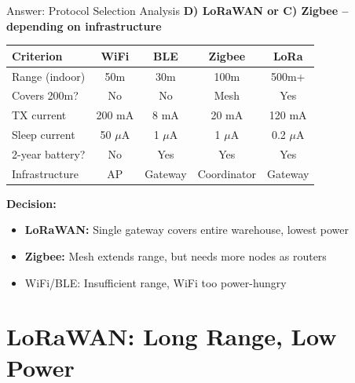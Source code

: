 \documentclass[aspectratio=169,11pt]{beamer}
\begin{document}
\begin{frame}{Answer: Protocol Selection Analysis}
    \textbf{D) LoRaWAN or C) Zigbee -- depending on infrastructure}
    
    \vspace{0.2cm}
    \begin{table}
        \centering
        \footnotesize
        \begin{tabular}{@{}lcccc@{}}
            \toprule
            \textbf{Criterion} & \textbf{WiFi} & \textbf{BLE} & \textbf{Zigbee} & \textbf{LoRa} \\
            \midrule
            Range (indoor) & 50m & 30m & 100m & 500m+ \\
            Covers 200m? & No & No & Mesh & Yes \\
            TX current & 200 mA & 8 mA & 20 mA & 120 mA \\
            Sleep current & 50 $\mu$A & 1 $\mu$A & 1 $\mu$A & 0.2 $\mu$A \\
            2-year battery? & No & Yes & Yes & Yes \\
            Infrastructure & AP & Gateway & Coordinator & Gateway \\
            \bottomrule
        \end{tabular}
    \end{table}
    
    \vspace{0.2cm}
    \textbf{Decision:}
    \begin{itemize}
        \item \textbf{LoRaWAN:} Single gateway covers entire warehouse, lowest power
        \item \textbf{Zigbee:} Mesh extends range, but needs more nodes as routers
        \item WiFi/BLE: Insufficient range, WiFi too power-hungry
    \end{itemize}
\end{frame}

\section{LoRaWAN: Long Range, Low Power}
\end{document}
